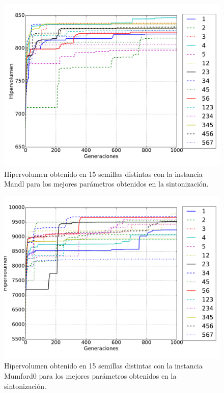 \begin{figure}[!htb]
\centering
\includegraphics[width=\textwidth]{img/hyp_Mandl}
\caption{Hipervolumen obtenido en 15 semillas distintas con la instancia Mandl para los mejores parámetros obtenidos en la sintonización.}
\label{fig:hyp_mandl}
\end{figure}

\begin{figure}[!htb]
\centering
\includegraphics[width=\textwidth]{img/hyp_Mumford0}
\caption{Hipervolumen obtenido en 15 semillas distintas con la instancia Mumford0 para los mejores parámetros obtenidos en la sintonización.}
\label{fig:hyp_mandl}
\end{figure}


